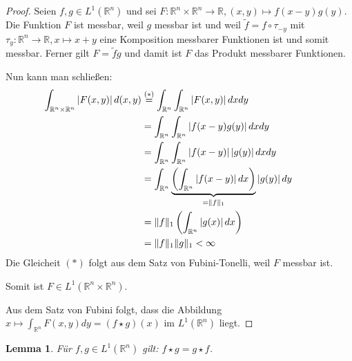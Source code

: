 \documentclass{article}
\newcommand{\R}[0]{\mathbb{R}}
\newtheorem{lemma}{Lemma}
\begin{document}
\begin{proof}
    Seien $f,g \in L^1(\R^n)$ und sei $F: \R^n \times \R^n \to \R, (x,y) \mapsto f(x - y)g(y)$. Die Funktion $F$ ist messbar,
    weil $g$ messbar ist und weil $\tilde{f} = f \circ \tau_{-y}$ mit $\tau_y: \R^n \to \R, x \mapsto x + y$ eine Komposition messbarer Funktionen ist
    und somit messbar. Ferner gilt $F = \tilde{f}g$ und damit ist $F$ das Produkt messbarer Funktionen.

    Nun kann man schließen:
    \begin{align*}
        \hspace{-23px}\int_{\R^n \times \R^n} \left| F(x,y)\right| d(x,y) &\overset{(*)}{=} \int_{\R^n}\int_{\R^n} \left| F(x,y)\right| dxdy \\
        &= \int_{\R^n}\int_{\R^n} \left|f(x - y)g(y)\right| dxdy \\
        &= \int_{\R^n}\int_{\R^n} \left| f(x - y) \right| \left| g(y) \right| dx dy \\
        &= \int_{\R^n} \underbrace{\left(\int_{\R^n} \left| f(x - y) \right| dx \right)}_{=\lVert f \rVert_1} \left| g(y) \right| dy \\
        &= \lVert f \rVert_1 \left(\int_{\R^n} \left| g(x) \right| dx\right) \\ 
        &= \lVert f \rVert_1 \lVert g \rVert_1 < \infty
    \end{align*}
    Die Gleicheit $(*)$ folgt aus dem Satz von Fubini-Tonelli, weil $F$ messbar ist.

    Somit ist $F \in L^1(\R^n \times \R^n)$.
    
    Aus dem Satz von Fubini folgt, dass die Abbildung $x \mapsto \int_{\R^n} F(x,y) dy = (f\star g)(x)$ im $L^1(\R^n)$ liegt.
\end{proof}

\begin{lemma}\label{lem:convsym}
    Für $f,g \in L^1(\R^n)$ gilt: $f \star g = g \star f$.
\end{lemma}
\end{document}
